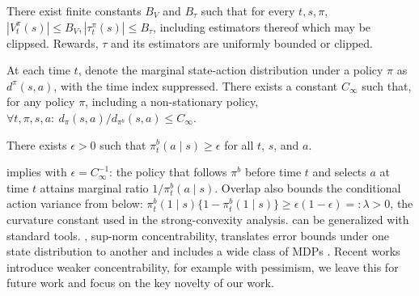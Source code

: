 \documentclass[opre,nonblindrev]{informs4}
\newcommand{\az}[1]{{\color{purple} [\textbf{az:}~#1]}}
\newcommand{\blipadv}{\tau}
\newcommand{\boundadv}{B_\blipadv}
\begin{document}
\begin{assumption}[Boundedness]\label{asn-bounded values}
There exist finite constants $B_V$ and $\boundadv$ such that for every $t,s,\pi$, $|V_t^\pi(s)|\le B_V,
|\blipadv_t^\pi(s)|\le \boundadv$, including estimators thereof which may be clippsed. Rewards, $\blipadv$ and its estimators are uniformly bounded or clipped. 
\end{assumption}
\begin{assumption}\label{asn-concentrability}
At each time $t$, denote the marginal state-action distribution under a
policy $\pi$ as $d^{\pi}(s,a)$, with the time index suppressed. There exists
a constant $C_\infty$ such that, for any policy $\pi$, including a
non-stationary policy,
$\textstyle
\forall t,\pi,s,a:\ d_\pi(s,a)/d_{\pi^b}(s,a)\leq C_\infty.
$
\end{assumption}
\begin{assumption}[Overlap]\label{asn-overlap}
There exists $\epsilon>0$ such that $\pi_t^b(a\mid s)\ge\epsilon$
for all $t$, $s$, and $a$.
\end{assumption}
 implies  with
$\epsilon=C_\infty^{-1}$: the policy that follows $\pi^b$ before time $t$
and selects $a$ at time $t$ attains marginal ratio $1/\pi_t^b(a\mid s)$.
Overlap also bounds the conditional action variance from below:
$\pi_t^b(1\mid s)\{1-\pi_t^b(1\mid s)\}\ge\epsilon(1-\epsilon)=:\lambda>0$,
the curvature constant used in the strong-convexity analysis.
{ can be generalized with standard tools}. 
, sup-norm concentrability, translates error bounds under one state distribution to another and includes a wide class of MDPs \citep{munos2008finite}. Recent works introduce weaker concentrability, for example with pessimism, we leave this for future work and focus on the key novelty of our work. 
\end{document}
